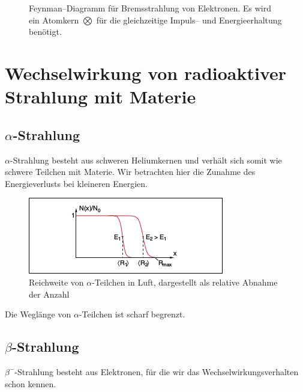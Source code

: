 \documentclass[Ex4_Zusammenfassung.tex]{subfiles}
\begin{document}
\begin{figure}[H]
	\centering
		\caption{Feynman--Diagramm für Bremsstrahlung von Elektronen. Es wird ein Atomkern $\bigotimes$ für die gleichzeitige Impuls-- und Energieerhaltung benötigt.}
\end{figure}

\section{Wechselwirkung von radioaktiver Strahlung mit Materie}
\subsection{$\alpha$-Strahlung}
$\alpha$-Strahlung besteht aus schweren Heliumkernen und verhält sich somit wie schwere Teilchen mit Materie. Wir betrachten hier die Zunahme des Energieverlusts bei kleineren Energien.

\begin{figure}[H]
	\centering
	\includegraphics{alpha-Strahlung_Reichweite.png}
	\caption{Reichweite von $\alpha$-Teilchen in Luft, dargestellt als relative Abnahme der Anzahl}
\end{figure}
Die Weglänge von $\alpha$-Teilchen ist scharf begrenzt.

\subsection{$\beta$-Strahlung}
$\beta^-$-Strahlung besteht aus Elektronen, für die wir das Wechselwirkungsverhalten schon kennen. 
\end{document}

